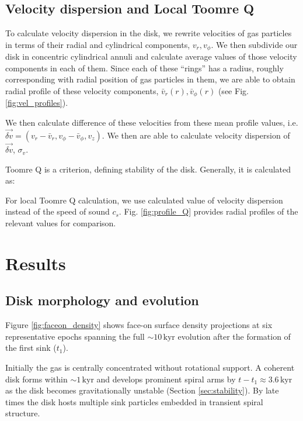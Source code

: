 \documentclass[twocolumn,11pt]{article}
\newcommand{\kyr}{\,\mathrm{kyr}}
\newcommand{\tform}{t_1}
\begin{document}
\subsection{Velocity dispersion and Local Toomre Q}
\label{sec:veld}

To calculate velocity dispersion in the disk, we rewrite velocities of gas particles
in terms of their radial and cylindrical components, $v_r, v_\phi$.
We then subdivide our disk in concentric cylindrical annuli and calculate average
values of those velocity components in each of them. Since each of these ``rings''
has a radius, roughly corresponding with radial position of gas particles in them,
we are able to obtain radial profile of these velocity components,
$\bar{v}_r (r), \bar{v}_\phi (r)$ (see Fig. \ref{fig:vel_profiles}).

We then calculate difference of these velocities from these mean profile values, i.e.
$\vec{\delta v} = (v_r - \bar{v}_r, v_\phi - \bar{v}_\phi, v_z)$.
We then are able to calculate velocity dispersion of $\vec{\delta v}$, $\sigma_v$.

Toomre Q is a criterion, defining stability of the disk. Generally, it is calculated as:


For local Toomre Q calculation, we use calculated value of velocity dispersion
instead of the speed of sound $c_s$. Fig. \ref{fig:profile_Q} provides radial
profiles of the relevant values for comparison.


\section{Results}
\label{sec:results}


\subsection{Disk morphology and evolution}
\label{sec:morphology}

Figure \ref{fig:faceon_density} shows face-on surface density projections
at six representative epochs spanning the full $\sim 10\kyr$ evolution after
the formation of the first sink ($\tform$).

Initially the gas is centrally concentrated without rotational support.
A coherent disk forms within $\sim 1\kyr$ and develops prominent spiral
arms by $t - \tform \approx 3.6\kyr$ as the disk becomes gravitationally
unstable (Section \ref{sec:stability}).
By late times the disk hosts multiple sink particles embedded in transient
spiral structure.
\end{document}

